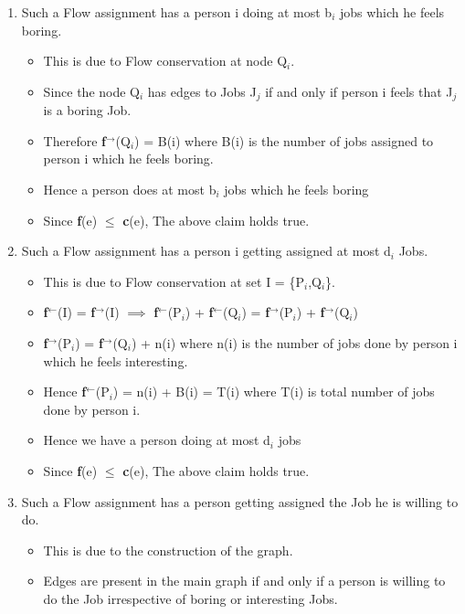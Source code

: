 \documentclass{report}
\begin{document}
 \begin{enumerate}
     \item Such a Flow assignment has a person i doing at most b$_i$ jobs which he feels boring.
     \begin{itemize}
         \item This is due to Flow conservation at node Q$_i$.
         \item Since the node Q$_i$ has edges to Jobs J$_j$ if and only if person i feels that  J$_j$ is a boring Job.
         \item Therefore \textbf{f}$^\rightarrow$(Q$_i$) = B(i) where B(i) is the number of  jobs assigned to person i which he feels boring.
         \item Hence a person does at most b$_i$ jobs which he feels boring 
         \item Since \textbf{f}(e) $\leq$ \textbf{c}(e), The above claim holds true.
     \end{itemize}
     \item Such a Flow assignment has a person i getting assigned at most d$_i$ Jobs.
     \begin{itemize}
         \item This is due to Flow conservation at set I = \{P$_i$,Q$_i$\}.
         \item \textbf{f}$^\gets$(I) = \textbf{f}$^\rightarrow$(I) $\implies$ \textbf{f}$^\gets$(P$_i$) + \textbf{f}$^\gets$(Q$_i$) = \textbf{f}$^\rightarrow$(P$_i$) + \textbf{f}$^\rightarrow$(Q$_i$)
         \item \textbf{f}$^\rightarrow$(P$_i$) = \textbf{f}$^\rightarrow$(Q$_i$) + n(i) where n(i) is the number of jobs done by person i which he feels interesting.
         \item Hence \textbf{f}$^\gets$(P$_i$) = n(i) + B(i) = T(i) where T(i) is total number of jobs done by person i.
         \item Hence we have a person doing at most d$_i$ jobs
         \item Since \textbf{f}(e) $\leq$ \textbf{c}(e), The above claim holds true.
     \end{itemize}
     \item Such a Flow assignment has a person getting assigned the Job he is willing to do.
     \begin{itemize}
         \item This is due to the construction of the graph.
         \item Edges are present in the main graph if and only if a person is willing to do the Job irrespective of boring or interesting Jobs.

\end{itemize}
\end{enumerate}
\end{document}

